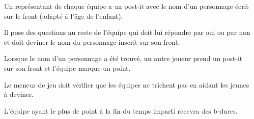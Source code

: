 \documentclass{grand-jeu}
\begin{document}
\begin{liste-materiel}
\end{liste-materiel}

\begin{regles}
Un représentant de chaque équipe a un post-it avec le nom d'un personnage écrit sur le front (adapté à l'âge de l'enfant).

Il pose des questions au reste de l'équipe qui doit lui répondre par oui ou par non et doit deviner le nom du personnage inscrit sur son front.

Lorsque le nom d'un personnage a été trouvé, un autre joueur prend un post-it sur son front et l'équipe marque un point.

Le meneur de jeu doit vérifier que les équipes ne trichent pas en aidant les jeunes à deviner.

L’équipe ayant le plus de point à la fin du temps imparti recevra des b-dures.
\end{regles}

\begin{imaginaire}
\end{imaginaire}

\begin{moments-stop}
\end{moments-stop}
\end{document}
